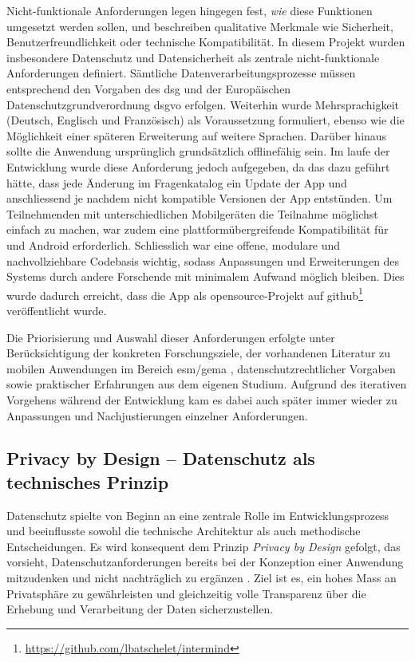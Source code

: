 Nicht-funktionale Anforderungen legen hingegen fest, \textit{wie} diese Funktionen umgesetzt werden sollen, und beschreiben qualitative Merkmale wie Sicherheit, Benutzerfreundlichkeit oder technische Kompatibilität. In diesem Projekt wurden insbesondere Datenschutz und Datensicherheit als zentrale nicht-funktionale Anforderungen definiert. Sämtliche Datenverarbeitungsprozesse müssen entsprechend den Vorgaben des \acrfull{dsg} und der Europäischen Datenschutzgrundverordnung \acrshort{dsgvo} erfolgen. Weiterhin wurde Mehrsprachigkeit (Deutsch, Englisch und Französisch) als Voraussetzung formuliert, ebenso wie die Möglichkeit einer späteren Erweiterung auf weitere Sprachen. Darüber hinaus sollte die Anwendung ursprünglich grundsätzlich offlinefähig sein. Im laufe der Entwicklung wurde diese Anforderung jedoch aufgegeben, da das dazu geführt hätte, dass jede Änderung im Fragenkatalog ein Update der App und anschliessend je nachdem nicht kompatible Versionen der App entstünden. Um Teilnehmenden mit unterschiedlichen Mobilgeräten die Teilnahme möglichst einfach zu machen, war zudem eine plattformübergreifende Kompatibilität für  und Android erforderlich. Schliesslich war eine offene, modulare und nachvollziehbare Codebasis wichtig, sodass Anpassungen und Erweiterungen des Systems durch andere Forschende mit minimalem Aufwand möglich bleiben. Dies wurde dadurch erreicht, dass die App als \gls{opensource}-Projekt auf \gls{github}\footnote{\href{https://github.com/lbatschelet/intermind}{https://github.com/lbatschelet/intermind}} veröffentlicht wurde.

Die Priorisierung und Auswahl dieser Anforderungen erfolgte unter Berücksichtigung der konkreten Forschungsziele, der vorhandenen Literatur zu mobilen Anwendungen im Bereich \gls{esm}/\gls{gema} \parencite[u.a.][]{chenPerceivedUrbanEnvironment2025, bakolisUrbanMindUsing2018, randallDevelopmentTrialMobile2013}, datenschutzrechtlicher Vorgaben sowie praktischer Erfahrungen aus dem eigenen Studium. Aufgrund des iterativen Vorgehens während der Entwicklung kam es dabei auch später immer wieder zu Anpassungen und Nachjustierungen einzelner Anforderungen.

\subsection{Privacy by Design – Datenschutz als technisches Prinzip}

Datenschutz spielte von Beginn an eine zentrale Rolle im Entwicklungsprozess und beeinflusste sowohl die technische Architektur als auch methodische Entscheidungen. Es wird konsequent dem Prinzip \textit{Privacy by Design} gefolgt, das vorsieht, Datenschutzanforderungen bereits bei der Konzeption einer Anwendung mitzudenken und nicht nachträglich zu ergänzen \parencite{cavoukianPrivacyDesign72009}. Ziel ist es, ein hohes Mass an Privatsphäre zu gewährleisten und gleichzeitig volle Transparenz über die Erhebung und Verarbeitung der Daten sicherzustellen.


